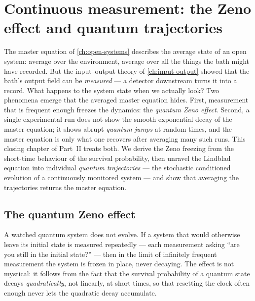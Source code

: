 \chapter{Continuous measurement: the Zeno effect and quantum trajectories}
\label{ch:continuous-measurement}

The master equation of \cref{ch:open-systems} describes the average
state of an open system: average over the environment, average over
all the things the bath might have recorded. But the input--output
theory of \cref{ch:input-output} showed that the bath's output
field can be \emph{measured} --- a detector downstream turns it into
a record. What happens to the system state when we actually look?
Two phenomena emerge that the averaged master equation hides. First,
measurement that is frequent enough freezes the dynamics: the
\emph{quantum Zeno effect}. Second, a single experimental run does
not show the smooth exponential decay of the master equation; it
shows abrupt \emph{quantum jumps} at random times, and the master
equation is only what one recovers after averaging many such runs.
This closing chapter of Part~II treats both. We derive the Zeno
freezing from the short-time behaviour of the survival probability,
then unravel the Lindblad equation into individual
\emph{quantum trajectories} --- the stochastic conditioned
evolution of a continuously monitored system --- and show that
averaging the trajectories returns the master equation.

\section{The quantum Zeno effect}
\label{sec:zeno}

\begin{phenomenon}
A watched quantum system does not evolve. If a system that would
otherwise leave its initial state is measured repeatedly --- each
measurement asking ``are you still in the initial state?'' --- then
in the limit of infinitely frequent measurement the system is
frozen in place, never decaying. The effect is not mystical: it
follows from the fact that the survival probability of a quantum
state decays \emph{quadratically}, not linearly, at short times, so
that resetting the clock often enough never lets the quadratic
decay accumulate.
\end{phenomenon}

